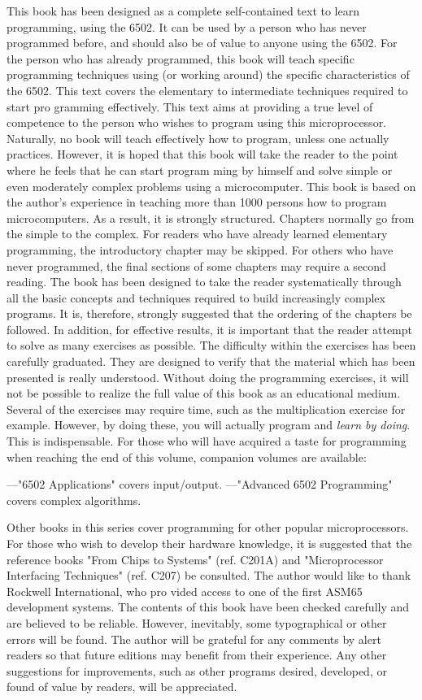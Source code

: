 This book has been designed as a complete self-contained text to learn programming, using the 6502. It can be used by a person who has never programmed before, and should also be of value to anyone using the 6502.
For the person who has already programmed, this book will teach specific programming techniques using (or working around) the specific characteristics of the 6502. This text covers the elementary to intermediate techniques required to start pro gramming effectively.
This text aims at providing a true level of competence to the person who wishes to program using this microprocessor. Naturally, no book will teach effectively how to program, unless one actually practices. However, it is hoped that this book will take the reader to the point where he feels that he can start program ming by himself and solve simple or even moderately complex problems using a microcomputer.
This book is based on the author's experience in teaching more than 1000 persons how to program microcomputers. As a result, it is strongly structured. Chapters normally go from the simple to the complex. For readers who have already learned elementary programming, the introductory chapter may be skipped. For others who have never programmed, the final sections of some chapters may require a second reading. The book has been designed to take the reader systematically through all the basic concepts and techniques required to build increasingly complex programs. It is, therefore, strongly suggested that the ordering of the chapters be followed. In addition, for effective results, it is important that the reader attempt to solve as many exercises as possible. The difficulty within the exercises has been carefully graduated. They are designed to verify that the material which has been presented is really understood. Without doing the programming exercises, it will not be possible to realize the full value of this book as an educational medium. Several of the exercises may require time, such as the multiplication exercise for example. However, by doing these, you will actually program and \textit{learn by doing}. This is indispensable.
For those who will have acquired a taste for programming when reaching the end of this volume, companion volumes are available:

—"6502 Applications" covers input/output.
—"Advanced 6502 Programming" covers complex algorithms.

Other books in this series cover programming for other popular microprocessors.
For those who wish to develop their hardware knowledge, it is suggested that the reference books "From Chips to Systems" (ref. C201A) and "Microprocessor Interfacing Techniques" (ref. C207) be consulted.
The author would like to thank Rockwell International, who pro vided access to one of the first ASM65 development systems.
The contents of this book have been checked carefully and are believed to be reliable. However, inevitably, some typographical or other errors will be found. The author will be grateful for any comments by alert readers so that future editions may benefit from their experience. Any other suggestions for improvements, such as other programs desired, developed, or found of value by readers, will be appreciated.

